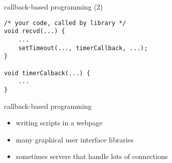 \begin{frame}[fragile]{callback-based programming (2)}
\begin{Verbatim}[fontsize=\small]
/* your code, called by library */
void recvd(...) {
    ...
    setTimeout(..., timerCallback, ...);
}

void timerCalback(...) {
    ...
}
\end{Verbatim}
\end{frame}

\begin{frame}{callback-based programming}
    \begin{itemize}
    \item writing scripts in a webpage
    \item many graphical user interface libraries
    \item sometimes servers that handle lots of connections
    \end{itemize}
\end{frame}

